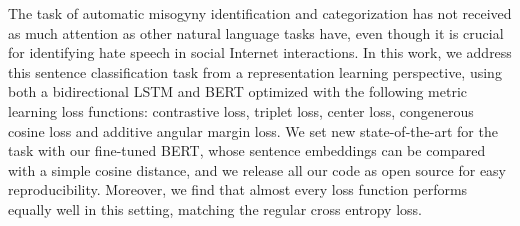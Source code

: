 The task of automatic misogyny identification and categorization has not received as much attention as other natural language tasks have, even though it is crucial for identifying hate speech in social Internet interactions. In this work, we address this sentence classification task from a representation learning perspective, using both a bidirectional LSTM and BERT optimized with the following metric learning loss functions: contrastive loss, triplet loss, center loss, congenerous cosine loss and additive angular margin loss. We set new state-of-the-art for the task with our fine-tuned BERT, whose sentence embeddings can be compared with a simple cosine distance, and we release all our code as open source for easy reproducibility. Moreover, we find that almost every loss function performs equally well in this setting, matching the regular cross entropy loss.

